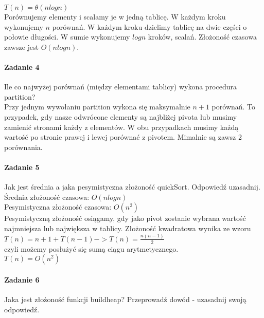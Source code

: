 \documentclass[18pt]{extarticle}
\begin{document}
$T(n)=\theta(nlogn)$ \\

Porównujemy elementy i scalamy je w jedną tablicę. W każdym kroku wykonujemy $n$ porównań. W każdym kroku dzielimy tablicę na dwie części o połowie długości. W sumie wykonujemy $logn$ kroków, scalań. Złożoność czasowa zawsze jest $O(nlogn)$.

\paragraph{Zadanie 4} Ile co najwyżej porównań (między elementami tablicy) wykona procedura partition? \\


Przy jednym wywołaniu partition wykona się maksymalnie $n+1$ porównań. To przypadek, gdy nasze odwrócone elementy są najbliżej pivota lub musimy zamienić stronami każdy z elementów. W obu przypadkach musimy każdą wartość po stronie prawej i lewej porównać z pivotem. Mimalnie są zawsz 2 porównania.

\paragraph{Zadanie 5} Jak jest średnia a jaka pesymistyczna złożoność quickSort. Odpowiedź uzasadnij. \\


Średnia złożoność czasowa: $O(nlogn)$ \\

Pesymistyczna złożoność czasowa: $O(n^2)$ \\

Pesymistyczną złożoność osiągamy, gdy jako pivot zostanie wybrana wartość najmniejsza lub największa w tablicy. Złożoność kwadratowa wynika ze wzoru \\

$T(n) = n + 1 + T(n-1) -> T(n)=\frac{n(n-1)}{2}$ \\

czyli możemy posłużyć się sumą ciągu arytmetycznego.\\

$T(n)=O(n^2)$

\paragraph{Zadanie 6} Jaka jest złożoność funkcji buildheap? Przeprowadź dowód - uzasadnij swoją odpowiedź.
\end{document}
